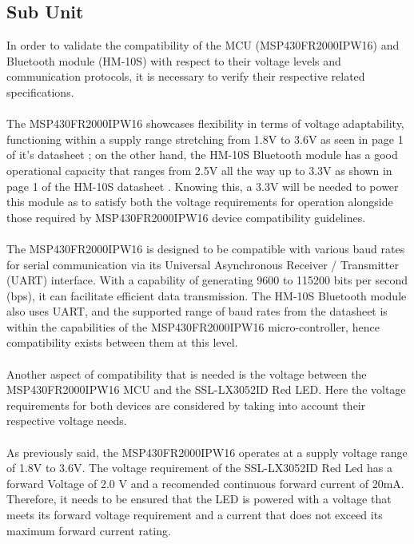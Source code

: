 \subsection{Sub Unit}
In order to validate the compatibility of the MCU (MSP430FR2000IPW16) and Bluetooth module (HM-10S) with respect to their voltage levels and communication protocols, it is necessary to verify their respective related specifications.\\\\
The MSP430FR2000IPW16 showcases flexibility in terms of voltage adaptability, functioning within a supply range stretching from 1.8V to 3.6V as seen in page 1 of it’s datasheet \cite{MSP430FR2000IPW16}; on the other hand, the HM-10S Bluetooth module has a good operational capacity that ranges from 2.5\si{\V} all the way up to 3.3\si{\V} as shown in page 1 of the HM-10S datasheet \cite{HM10BluetoothModule}. Knowing this, a 3.3\si{\V} will be needed to power this module as to satisfy both the voltage requirements for operation alongside those required by MSP430FR2000IPW16 device compatibility guidelines.\\\\
The MSP430FR2000IPW16 is designed to be compatible with various baud rates for serial communication via its Universal Asynchronous Receiver / Transmitter (UART) interface. With a capability of generating 9600 to 115200 bits per second (bps), it can facilitate efficient data transmission. The HM-10S Bluetooth module also uses UART, and the supported range of baud rates from the datasheet is within the capabilities of the MSP430FR2000IPW16 micro-controller, hence compatibility exists between them at this level.\\\\
Another aspect of compatibility that is needed is the voltage between the MSP430FR2000IPW16 MCU and the SSL-LX3052ID Red LED. Here the voltage requirements for both devices are considered by taking into account their respective voltage needs.\\\\
As previously said, the MSP430FR2000IPW16 operates at a supply voltage range of 1.8V to 3.6V. The voltage requirement of the SSL-LX3052ID Red Led has a forward Voltage of 2.0 V and a recomended continuous forward current of 20\si{\mA}. Therefore, it needs to be ensured that the LED is powered with a voltage that meets its forward voltage requirement and a current that does not exceed its maximum forward current rating. \\\\
